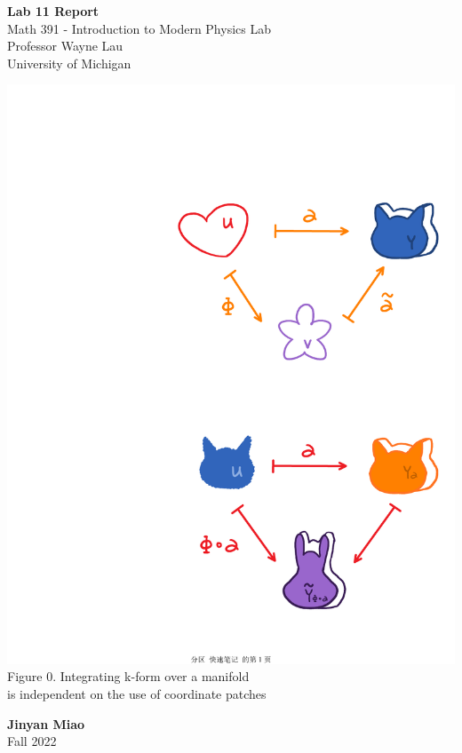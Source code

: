 \documentclass[11pt]{book}
\theoremstyle{break}
\theoremstyle{break}
\begin{document}
	\begin{titlepage}
		\begin{center}
			\vspace*{1cm}
			\Huge \color{red}
				\textbf{Lab 11 Report}\\
			\vspace{0.5cm}			
			\Large \color{black}
				Math 391 - Introduction to Modern Physics Lab\\
				Professor Wayne Lau\\	
				University of Michigan\\
			\vspace{3cm}

			\includegraphics[scale=0.6]{Intkform.pdf}\\
			\hfill\break
			\color{gray}Figure 0. Integrating k-form over a manifold\\is independent on the use of coordinate patches\color{black}
			
			
			
			\vspace{5cm}
			\LARGE
				\textbf{Jinyan Miao}\\
				\hfill\break
				\LARGE Fall 2022\\
			\vspace{1cm}

		\vspace*{\fill}
		\end{center}			
	\end{titlepage}
\end{document}
